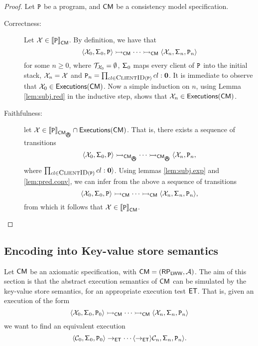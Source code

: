 \begin{proof}
Let $\texttt{P}$ be a program, and $\mathsf{CM}$ be a consistency model specification.
\begin{description}
\item[Correctness:] Let $\mathcal{X} \in {\llbracket \texttt{P}\rrbracket}_{\mathsf{CM}}$. By definition, we have that 
\[ 
\langle \mathcal{X}_0, \mathsf{\Sigma}_{0}, \texttt{P} \rangle \rightarrowtail_{\mathsf{CM}} \cdots \rightarrowtail_{\mathsf{CM}} \langle \mathcal{X}_{n}, \mathsf{\Sigma}_{n}, 
\texttt{P}_{n} \rangle 
\]
for some $n \geq 0$, where $\mathcal{T}_{\mathcal{X}_0} = \emptyset$, $\mathsf{\Sigma}_{0}$ maps every client of $\texttt{P}$ into the initial stack, 
$\mathcal{X}_n = \mathcal{X}$
and $\prog_{n} = \prod_{\tid \in \Clients(\prog)} \tid: \nil$. It is immediate to observe that 
$\mathcal{X}_0 \in {\mathsf{Executions}}(\mathsf{CM})$. Now a simple induction on $n$, using Lemma \ref{lem:subj.red} 
in the inductive step, shows that $\mathcal{X}_n \in {\mathsf{Executions}}(\mathsf{CM})$.
\item[Faithfulness:] let $\aexec \in \interpr{\prog}_{\CM_{\anarchicsmall}} \cap \aeset(\CM)$. 
That is, there exists a sequence of transitions 
\[
\langle \aexec_0, \thdstackFun_{0}, \prog \rangle \absrightarrow_{\CM_{\anarchicsmall}} \cdots \absrightarrow_{\CM_{\anarchicsmall}} \langle \aexec_{n}, \prog_n, 
\]
where $\prod_{\tid \in \Clients(\prog)} \tid: \nil \rangle$.
Using lemmas \ref{lem:subj.exp} and \ref{lem:pred.conv}, we can infer from the above a sequence of transitions
\[
\langle \mathcal{X}_0, \mathsf{\Sigma}_{0}, \texttt{P} \rangle \rightarrowtail_{\mathsf{CM}} \cdots \rightarrowtail_{\mathsf{CM}} \langle \mathcal{X}_{n}, \mathsf{\Sigma}_{n}, 
\texttt{P}_{n} \rangle,
\]
from which it follows that $\mathcal{X} \in {\llbracket \texttt{P}\rrbracket}_{\mathsf{CM}}$.
\end{description}
\end{proof}

\subsection{Encoding into Key-value store semantics}
Let $\mathsf{CM}$ be an axiomatic specification, with $\mathsf{CM} = (\mathsf{RP}_{\mathsf{LWW}}, \mathcal{A})$. 
The aim of this section is that the abstract execution semantics of $\mathsf{CM}$ can be 
simulated by the key-value store semantics, for an appropriate execution test $\mathsf{ET}$. 
That is, given an execution of the form 
\[
\langle \mathcal{X}_0, \mathsf{\Sigma}_{0}, \texttt{P}_0 \rangle \rightarrowtail_{\mathsf{CM}} \cdots \rightarrowtail_{\mathsf{CM}} \langle \mathcal{X}_{n}, \mathsf{\Sigma}_{n}, \texttt{P}_{n} \rangle
\]
we want to find an equivalent execution 
\[
\langle \mathcal{C}_{0}, \mathsf{\Sigma}_{0}, \texttt{P}_0 \rangle \rightarrow_{\mathsf{ET}} \cdots \langle \rightarrow_{\mathsf{ET}} \rangle \mathcal{C}_n, \mathsf{\Sigma}_{n}, \texttt{P}_{n} 
\rangle.
\]


